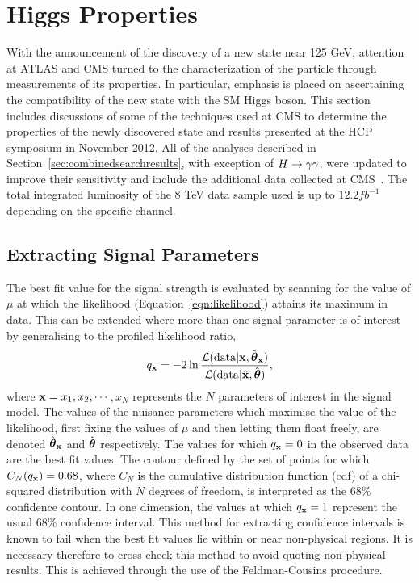 \section{Higgs Properties}
\label{sec:properties}

With the announcement of the discovery of a new state near 125 GeV, attention at ATLAS and CMS 
turned to the characterization of the particle through  measurements of its properties. 
In particular, emphasis is placed on ascertaining the compatibility 
of the new state with the SM Higgs boson.
This section includes discussions of some of the techniques used at CMS to determine the properties 
of the newly discovered state and results presented at the HCP symposium in November 2012. 
All of the analyses described in Section~\ref{sec:combinedsearchresults},
with exception of $H\rightarrow\gamma\gamma$, were updated to improve their sensitivity 
and include the additional data collected at CMS~\citep{HIG-12-045}. The total integrated 
luminosity of the 8 TeV data sample used is up to $12.2 fb^{-1}$ depending on the
specific channel.

\subsection{Extracting Signal Parameters}

The best fit value for the signal strength is evaluated 
by scanning for the value of $\mu$ at which the likelihood (Equation~\ref{eqn:likelihood})
attains its maximum in data. This can be extended where more than one signal parameter
is of interest by generalising to the profiled likelihood ratio,
\begin{equation}
q_{{\mathbf{x}}} = 
	-2\ln\frac{\displaystyle \mathcal{L}(\mathrm{data} | {\mathbf{x}},\hat{{\boldsymbol{\theta}}}_{{\mathbf{x}}})}
	{\displaystyle \mathcal{L}(\mathrm{data} | \hat{{\mathbf{x}}},\hat{{\boldsymbol{\theta}}})}, 
\label{eqn:llrNd}
\end{equation}
where ${\mathbf{x}}=x_{1},x_{2},\cdots$$,x_{N}$ represents the $N$ parameters
of interest in the signal model. The values of the nuisance parameters 
which maximise the value of the likelihood, first 
fixing the values of $\mu$ and then letting them float freely, are
denoted $\hat{{\boldsymbol{\theta}}}_{{\mathbf{x}}}$ and $\hat{{\boldsymbol{\theta}}}$ respectively.
The values for which $q_{{\mathbf{x}}}=0$ in the observed data are the best fit values.
The contour defined by the set of points for which $C_{N}(q_{{\mathbf{x}}})=0.68$,
where $C_{N}$ is the cumulative distribution function (cdf) of a chi-squared distribution
with $N$ degrees of freedom, is interpreted
as the 68\% confidence contour. In one dimension, the values at which $q_{{\mathbf{x}}}=1$
represent the usual 68\% confidence interval.
This method for extracting confidence intervals is known to fail when the best fit 
values lie within or near non-physical regions.
It is necessary therefore to cross-check this method to avoid quoting
non-physical results. This is achieved through the use of the Feldman-Cousins procedure.

